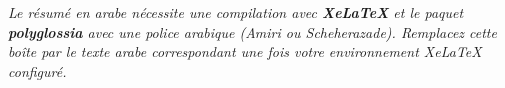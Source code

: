 %
%

\begin{infobox}[title={Résumé en arabe}]
  \textit{Le résumé en arabe nécessite une compilation avec \textbf{XeLaTeX}
  et le paquet \textbf{polyglossia} avec une police arabique (Amiri ou
  Scheherazade). Remplacez cette boîte par le texte arabe correspondant
  une fois votre environnement XeLaTeX configuré.}
\end{infobox}

